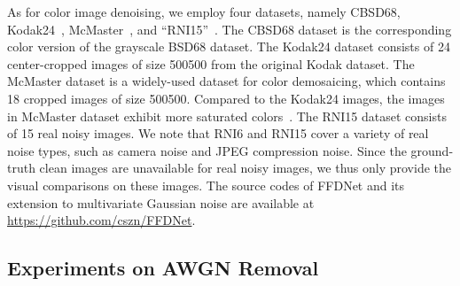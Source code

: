 \documentclass[journal]{IEEEtran}
\begin{document}
As for color image denoising, we employ four datasets, namely CBSD68, Kodak24~\cite{franzen1999kodak}, McMaster~\cite{zhang2011color}, and ``RNI15''~\cite{lebrun2015noise,RNI1}.
The CBSD68 dataset is the corresponding color version of the grayscale BSD68 dataset. The Kodak24 dataset consists of 24 center-cropped images of size 500500 from the original Kodak dataset. The McMaster dataset is a widely-used dataset for color demosaicing, which contains 18 cropped images of size 500500.
Compared to the Kodak24 images, the images in McMaster dataset exhibit more saturated colors~\cite{zhang2011color}.
The RNI15 dataset consists of 15 real noisy images. We note that RNI6 and RNI15 cover a variety of real noise types, such as camera noise and JPEG compression noise. Since the ground-truth clean images are unavailable for real noisy images, we thus only provide the visual comparisons on these images. The source codes of FFDNet and its extension to multivariate Gaussian noise are available at \url{https://github.com/cszn/FFDNet}.



\subsection{Experiments on AWGN Removal}
\end{document}
